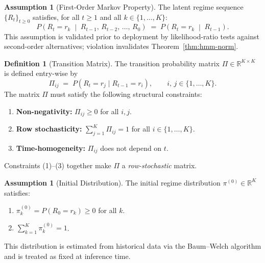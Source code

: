 \documentclass[12pt,openany]{book}
\numberwithin{equation}{chapter}
\theoremstyle{plain}
\theoremstyle{definition}
\newtheorem{definition}[theorem]{Definition}
\newtheorem{assumption}[theorem]{Assumption}
\theoremstyle{remark}
\numberwithin{equation}{chapter}
\theoremstyle{plain}
\begin{document}
\begin{assumption}[First-Order Markov Property]
\label{ass:markov}
The latent regime sequence $\{R_t\}_{t \geq 0}$ satisfies, for all
$t \geq 1$ and all $k \in \{1,\ldots,K\}$:
\begin{equation}
  P\!\left(R_t = r_k \;\middle|\; R_{t-1},\, R_{t-2},\, \ldots,\, R_0\right)
  \;=\;
  P\!\left(R_t = r_k \;\middle|\; R_{t-1}\right).
  \label{eq:markov}
\end{equation}
This assumption is validated prior to deployment by likelihood-ratio
tests against second-order alternatives; violation invalidates
Theorem~\ref{thm:hmm-norm}.
\end{assumption}

\begin{definition}[Transition Matrix]
\label{def:hmm-transition}
The transition probability matrix $\Pi \in \mathbb{R}^{K \times K}$ is
defined entry-wise by
\begin{equation}
  \Pi_{ij} \;=\; P(R_t = r_j \mid R_{t-1} = r_i),
  \qquad i,\,j \in \{1,\ldots,K\}.
  \label{eq:hmm-Pi}
\end{equation}
The matrix $\Pi$ must satisfy the following structural constraints:
\begin{enumerate}
  \item \textbf{Non-negativity:} $\Pi_{ij} \geq 0$ for all $i,j$.
  \item \textbf{Row stochasticity:} $\displaystyle\sum_{j=1}^{K} \Pi_{ij} = 1$
        for all $i \in \{1,\ldots,K\}$.
  \item \textbf{Time-homogeneity:} $\Pi_{ij}$ does not depend on $t$.
\end{enumerate}
Constraints (1)--(3) together make $\Pi$ a \emph{row-stochastic} matrix.
\end{definition}

\begin{assumption}[Initial Distribution]
\label{ass:init}
The initial regime distribution $\pi^{(0)} \in \mathbb{R}^K$ satisfies:
\begin{enumerate}
  \item $\pi^{(0)}_k = P(R_0 = r_k) \geq 0$ for all $k$.
  \item $\displaystyle\sum_{k=1}^{K} \pi^{(0)}_k = 1$.
\end{enumerate}
This distribution is estimated from historical data via the
Baum--Welch algorithm and is treated as fixed at inference time.
\end{assumption}
\end{document}
